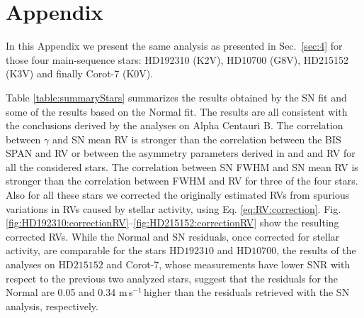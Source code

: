 \documentclass{aa}
\def\ms{\hbox{\,m\,s$^{-1}$}}         %
\begin{document}
\appendix
\section{Appendix} \label{appendix}

In this Appendix we present the same analysis as presented in Sec.~\ref{sec:4} for those four main-sequence stars: HD192310 (K2V), HD10700 (G8V), HD215152 (K3V) and finally Corot-7 (K0V).

Table \ref{table:summaryStars} summarizes the results obtained by the SN fit and some of the results based on the Normal fit. The results are all consistent with the conclusions derived by the analyses on Alpha Centauri B. The correlation between $\gamma$ and SN mean RV is stronger than the correlation between the BIS SPAN and RV or between the asymmetry parameters derived in \citet{Boisse-2009} and \citet{Figueira-2013} and RV for all the considered stars. The correlation between SN FWHM and SN mean RV is stronger than the correlation between FWHM and RV for three of the four stars.  Also for all these stars we corrected the originally estimated RVs from spurious variations in RVs caused by stellar activity, using Eq. \ref{eq:RV:correction}. Fig. \ref{fig:HD192310:correctionRV}--\ref{fig:HD215152:correctionRV} show the resulting corrected RVs. While the Normal and SN residuals, once corrected for stellar activity, are comparable for the stars $\text{HD}192310$ and $\text{HD}10700$, the results of the analyses on $\text{HD}215152$ and Corot-7, whose measurements have lower SNR with respect to the previous two analyzed stars, suggest that the residuals for the Normal are 0.05 and 0.34\,\ms\,higher than the residuals retrieved with the SN analysis, respectively.
\end{document}
